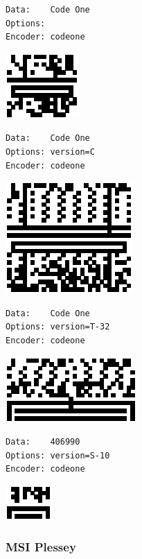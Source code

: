 \begin{verbatim}
Data:    Code One
Options: 
Encoder: codeone
\end{verbatim}

\includegraphics{images/codeone-1.eps}

\begin{verbatim}
Data:    Code One
Options: version=C
Encoder: codeone
\end{verbatim}

\includegraphics{images/codeone-2.eps}

\begin{verbatim}
Data:    Code One
Options: version=T-32
Encoder: codeone
\end{verbatim}

\includegraphics{images/codeone-3.eps}

\begin{verbatim}
Data:    406990
Options: version=S-10
Encoder: codeone
\end{verbatim}

\includegraphics{images/codeone-4.eps}

\hypertarget{msi-plessey}{%
\subsubsection{MSI Plessey}\label{msi-plessey}}

